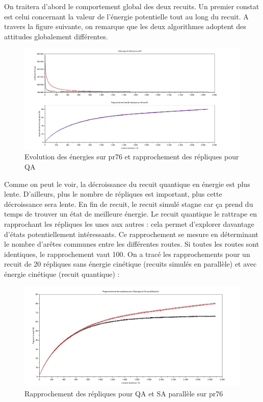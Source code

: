 \documentclass{article}%
\begin{document}
\vspace{1cm}

		On traitera d'abord le comportement global des deux recuits. Un premier constat est celui concernant la valeur de l'énergie potentielle tout au long du recuit. A travers la figure suivante, on remarque que les deux algorithmes adoptent des attitudes globalement différentes.
		
	\begin{figure}[h]
	\begin{center}
	\includegraphics[scale=0.25]{comparaison_pr76.jpg}
	\caption{Evolution des énergies sur pr76 et rapprochement des répliques pour QA}
	\label{QASA}
	\end{center}
	\end{figure}
		
		Comme on peut le voir, la décroissance du recuit quantique en énergie est plus lente. D'ailleurs, plus le nombre de répliques est important, plus cette décroissance sera lente. En fin de recuit, le recuit simulé stagne car ça prend du temps de trouver un état de meilleure énergie. Le recuit quantique le rattrape en rapprochant les répliques les unes aux autres : cela permet d'explorer davantage d'états potentiellement intéressants. 
		Ce rapprochement se mesure en déterminant le nombre d'arêtes communes entre les différentes routes. Si toutes les routes sont identiques, le rapprochement vaut 100. On a tracé les rapprochements pour un recuit de 20 répliques sans énergie cinétique (recuits simulés en parallèle) et avec énergie cinétique (recuit quantique) : 
		
	\begin{figure}[!h]
	\begin{center}
	\includegraphics[scale=0.3]{rapprochement.jpg}
	\caption{Rapprochement des répliques pour QA et SA parallèle sur pr76}
	\end{center}
	\end{figure}
\end{document}
